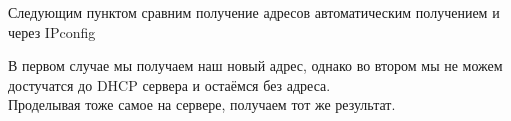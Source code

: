 \documentclass[a4paper,12pt]{article}
\begin{document}
Следующим пунктом сравним получение адресов автоматическим получением и через IPconfig
\begin{figure}[H]
    \centering
\end{figure}
В первом случае мы получаем наш новый адрес, однако во втором мы не можем
достучатся до DHCP сервера и остаёмся без адреса.\\ 
Проделывая тоже самое на сервере, получаем тот же результат.
\begin{figure}[H]
\end{figure}
\end{document}
